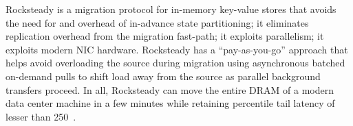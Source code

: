 Rocksteady is a migration protocol for in-memory key-value stores that avoids
the need for and overhead of in-advance state partitioning; it eliminates
replication overhead from the migration fast-path; it exploits parallelism;
it exploits modern NIC hardware.  Rocksteady has a
``pay-as-you-go'' approach that helps avoid overloading the source during migration
using asynchronous batched on-demand pulls to shift load away from the source
as parallel background transfers proceed.  In all, Rocksteady can move the entire DRAM
of a modern data center machine in a few minutes while retaining \nnnth
percentile tail latency of lesser than 250~\us.
